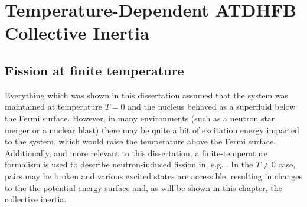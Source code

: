 \chapter{Temperature-Dependent ATDHFB Collective Inertia}\label{append:TD-ATDHFB}




\section{Fission at finite temperature}

Everything which was shown in this dissertation assumed that the system was maintained at temperature $T=0$ and the nucleus behaved as a superfluid below the Fermi surface. However, in many environments (such as a neutron star merger or a nuclear blast) there may be quite a bit of excitation energy imparted to the system, which would raise the temperature above the Fermi surface. Additionally, and more relevant to this dissertation, a finite-temperature formalism is used to describe neutron-induced fission in, e.g. \cite{Mcdonnell2014}. In the $T\neq0$ case, pairs may be broken and various excited states are accessible, resulting in changes to the the potential energy surface and, as will be shown in this chapter, the collective inertia.

